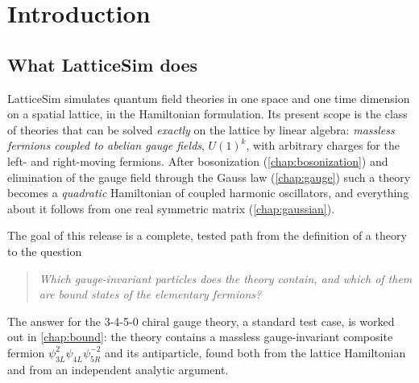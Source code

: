 \chapter{Introduction}\label{chap:intro}

\section{What LatticeSim does}
LatticeSim simulates quantum field theories in one space and one time dimension on a spatial lattice, in the
Hamiltonian formulation. Its present scope is the class of theories that can be solved \emph{exactly} on the
lattice by linear algebra: \emph{massless fermions coupled to abelian gauge fields}, $U(1)^k$, with arbitrary
charges for the left- and right-moving fermions. After bosonization (\cref{chap:bosonization}) and elimination
of the gauge field through the Gauss law (\cref{chap:gauge}) such a theory becomes a \emph{quadratic}
Hamiltonian of coupled harmonic oscillators, and everything about it follows from one real symmetric matrix
(\cref{chap:gaussian}).

The goal of this release is a complete, tested path from the definition of a theory to the question
\begin{quote}
\emph{Which gauge-invariant particles does the theory contain, and which of them are bound states of the
elementary fermions?}
\end{quote}
The answer for the 3-4-5-0 chiral gauge theory, a standard test case, is worked out in \cref{chap:bound}:
the theory contains a massless gauge-invariant composite fermion $\psi_{3L}^2\psi_{4L}\psi_{5R}^{-2}$ and its
antiparticle, found both from the lattice Hamiltonian and from an independent analytic argument.


